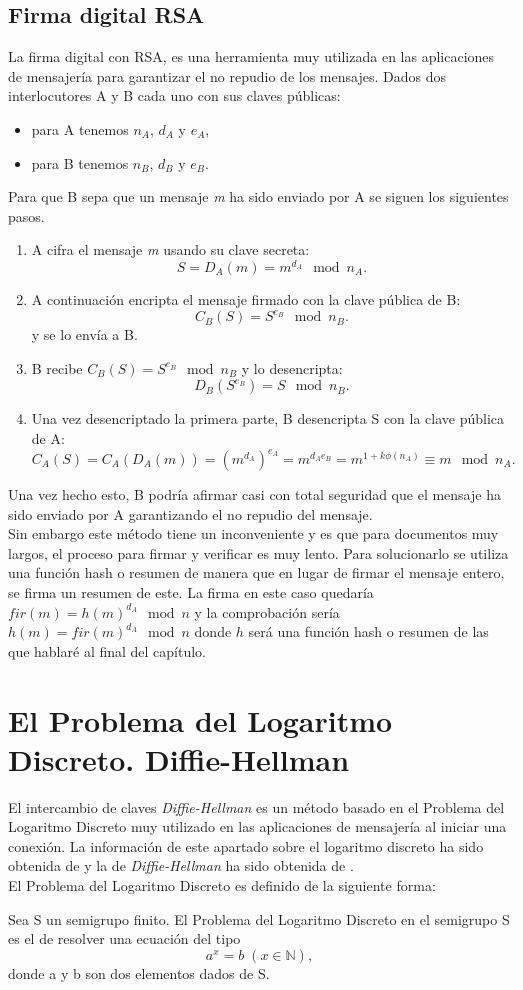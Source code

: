 \subsection{Firma digital RSA}
La firma digital con RSA, es una herramienta muy utilizada en las aplicaciones de mensajería para garantizar el no repudio de los mensajes.
Dados dos interlocutores A y B cada uno con sus claves públicas:
\begin{itemize}
	\item para A tenemos $n_A$, $d_A$ y $e_A$,  
	\item para B tenemos $n_B$, $d_B$ y $e_B$.  
\end{itemize}
Para que B sepa que un mensaje \emph{m} ha sido enviado por A se siguen los siguientes pasos.
\begin{enumerate}
	\item A cifra el mensaje \emph{m} usando su clave secreta:
		$$
			S=D_A(m)=m^{d_A} \mod n_A.
		$$
	\item A continuación encripta el mensaje firmado con la clave pública de B:
		$$
			C_B(S)=S^{e_B}\mod n_B.
		$$
		y se lo envía a B.
	\item B recibe $C_B(S)=S^{e_B} \mod n_B$ y lo desencripta: 
		$$
			D_B(S^{e_B})=S \mod n_B.
		$$
	\item Una vez desencriptado la primera parte, B desencripta S con la clave pública de A:
		$$
			C_A(S)=C_A(D_A(m))=(m^{d_A})^{e_A}=m^{d_Ae_B}=m^{1+k\phi(n_A)}\equiv m \mod n_A.
		$$
\end{enumerate}
Una vez hecho esto, B podría afirmar casi con total seguridad que el mensaje ha sido enviado por A garantizando el no repudio del mensaje.\\
Sin embargo este método tiene un inconveniente y es que para documentos muy largos, el proceso para firmar y verificar es muy lento. Para solucionarlo se utiliza una función hash o resumen de manera que en lugar de firmar el mensaje entero, se firma un resumen de este. La firma en este caso quedaría $fir(m)=h(m)^{d_A} \mod n$ y la comprobación sería $h(m)=fir(m)^{d_A} \mod n$ donde $h$ será una función hash o resumen de las que hablaré al final del capítulo.

\section{El Problema del Logaritmo Discreto. Diffie-Hellman}
El intercambio de claves \emph{Diffie-Hellman} es un método basado en el Problema del Logaritmo Discreto muy utilizado en las aplicaciones de mensajería al iniciar una conexión. La información de este apartado sobre el logaritmo discreto ha sido obtenida de \cite{angelRiosMateos} y la de \emph{Diffie-Hellman} ha sido obtenida de \cite{En2011}.\\
El Problema del Logaritmo Discreto es definido de la siguiente forma:
\begin{definicion}
	Sea S un semigrupo finito. El Problema del Logaritmo Discreto en el semigrupo S es el de resolver una ecuación del tipo\\
		$$
			a^x\!=b\;(x\in \mathbb{N}),
		$$
	donde a y b son dos elementos dados de S.
\end{definicion}

